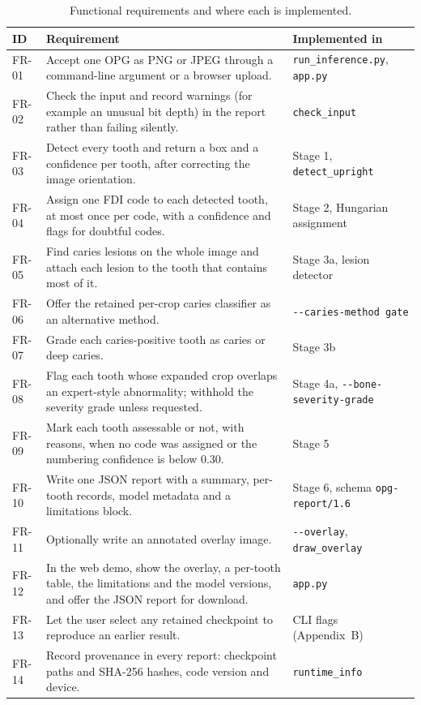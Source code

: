 \begin{table}[!htbp]
\centering
\caption[Functional requirements]{Functional requirements and where each is implemented.}
\label{tab:fr}
\small
\begin{tabularx}{\textwidth}{@{}L{1.4cm}YL{4.0cm}@{}}
\toprule
ID & Requirement & Implemented in\\
\midrule
FR-01 & Accept one OPG as PNG or JPEG through a command-line argument or a browser upload. & \texttt{run\_inference.py}, \texttt{app.py}\\
FR-02 & Check the input and record warnings (for example an unusual bit depth) in the report rather than failing silently. & \texttt{check\_input}\\
FR-03 & Detect every tooth and return a box and a confidence per tooth, after correcting the image orientation. & Stage 1, \texttt{detect\_upright}\\
FR-04 & Assign one FDI code to each detected tooth, at most once per code, with a confidence and flags for doubtful codes. & Stage 2, Hungarian assignment\\
FR-05 & Find caries lesions on the whole image and attach each lesion to the tooth that contains most of it. & Stage 3a, lesion detector\\
FR-06 & Offer the retained per-crop caries classifier as an alternative method. & \texttt{-{}-caries-method gate}\\
FR-07 & Grade each caries-positive tooth as caries or deep caries. & Stage 3b\\
FR-08 & Flag each tooth whose expanded crop overlaps an expert-style abnormality; withhold the severity grade unless requested. & Stage 4a, \texttt{-{}-bone-severity-grade}\\
FR-09 & Mark each tooth assessable or not, with reasons, when no code was assigned or the numbering confidence is below 0.30. & Stage 5\\
FR-10 & Write one JSON report with a summary, per-tooth records, model metadata and a limitations block. & Stage 6, schema \texttt{opg-report/1.6}\\
FR-11 & Optionally write an annotated overlay image. & \texttt{-{}-overlay}, \texttt{draw\_overlay}\\
FR-12 & In the web demo, show the overlay, a per-tooth table, the limitations and the model versions, and offer the JSON report for download. & \texttt{app.py}\\
FR-13 & Let the user select any retained checkpoint to reproduce an earlier result. & CLI flags (Appendix~B)\\
FR-14 & Record provenance in every report: checkpoint paths and SHA-256 hashes, code version and device. & \texttt{runtime\_info}\\
\bottomrule
\end{tabularx}
\end{table}

